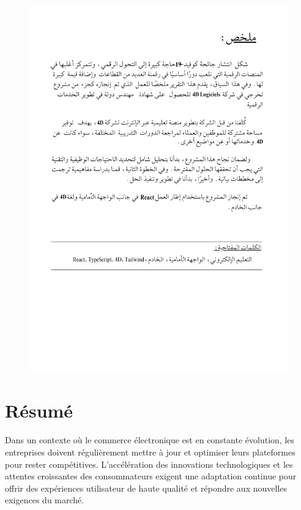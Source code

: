 

\begin{figure}[H]
    \thispagestyle{plain}
    \centering
    \includegraphics[width=19cm]{Figures/abstract.png}
\end{figure}


\newpage

\chapter*{Résumé}

Dans un contexte où le commerce électronique est en constante évolution, les entreprises doivent régulièrement mettre à jour et optimiser leurs plateformes pour rester compétitives. L'accélération des innovations technologiques et les attentes croissantes des consommateurs exigent une adaptation continue pour offrir des expériences utilisateur de haute qualité et répondre aux nouvelles exigences du marché. \\
\vspace{10pt}


